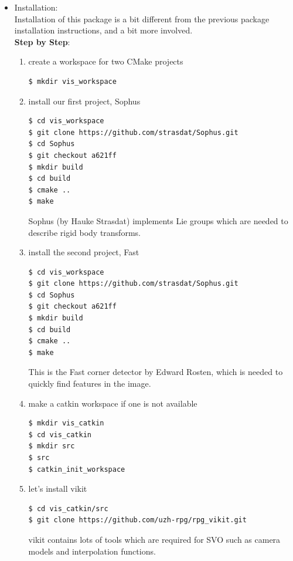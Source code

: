 \begin{itemize}
\begin{itemize}
\end{itemize}

\item Installation:\\

Installation of this package is a bit different from the previous package installation instructions, and a bit more involved.\\

\textbf{Step by Step}:
\begin{enumerate}
\item create a workspace for two CMake projects
\begin{lstlisting}[language=bash]
$ mkdir vis_workspace
\end{lstlisting}
\item install our first project, Sophus
\begin{lstlisting}[language=bash]
$ cd vis_workspace
$ git clone https://github.com/strasdat/Sophus.git
$ cd Sophus
$ git checkout a621ff
$ mkdir build
$ cd build
$ cmake ..
$ make
\end{lstlisting}
Sophus (by Hauke Strasdat) implements Lie groups which are needed to describe rigid body transforms. \\ 

\item install the second project, Fast
\begin{lstlisting}[language=bash]
$ cd vis_workspace
$ git clone https://github.com/strasdat/Sophus.git
$ cd Sophus
$ git checkout a621ff
$ mkdir build
$ cd build
$ cmake ..
$ make
\end{lstlisting}
This is the Fast corner detector by Edward Rosten, which is needed to quickly find features in the image.\\

\item make a catkin workspace if one is not available
\begin{lstlisting}[language=bash]
$ mkdir vis_catkin
$ cd vis_catkin
$ mkdir src
$ src
$ catkin_init_workspace
\end{lstlisting}
\item let's install vikit
\begin{lstlisting}[language=bash]
$ cd vis_catkin/src
$ git clone https://github.com/uzh-rpg/rpg_vikit.git
\end{lstlisting}
vikit contains lots of tools which are required for SVO such as camera models and interpolation functions.\\


\end{enumerate}
\end{itemize}
